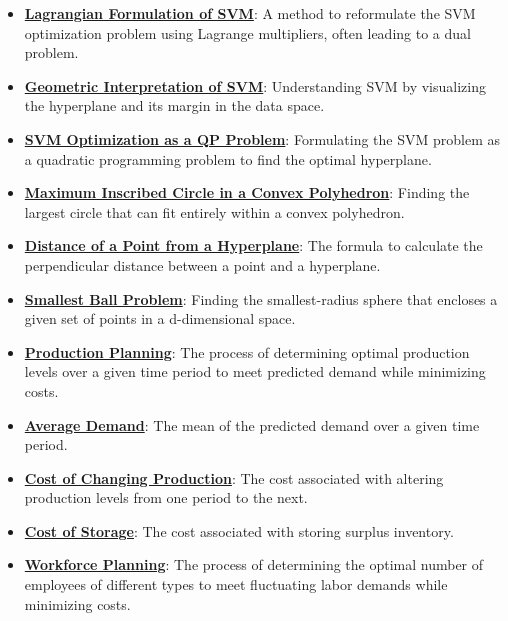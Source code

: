 \documentclass{article}%
\begin{document}
\begin{itemize}[leftmargin=*]
\item \href{https://www.math.purdue.edu/~yipn/421/2024-10-22-Regression.pdf#page=11}{\textbf{Lagrangian Formulation of SVM}}: A method to reformulate the SVM optimization problem using Lagrange multipliers, often leading to a dual problem.%
\item \href{https://www.math.purdue.edu/~yipn/421/2024-10-22-Regression.pdf#page=12}{\textbf{Geometric Interpretation of SVM}}: Understanding SVM by visualizing the hyperplane and its margin in the data space.%
\item \href{https://www.math.purdue.edu/~yipn/421/2024-10-22-Regression.pdf#page=13}{\textbf{SVM Optimization as a QP Problem}}: Formulating the SVM problem as a quadratic programming problem to find the optimal hyperplane.%
\item \href{https://www.math.purdue.edu/~yipn/421/2024-10-22-Regression.pdf#page=15}{\textbf{Maximum Inscribed Circle in a Convex Polyhedron}}: Finding the largest circle that can fit entirely within a convex polyhedron.%
\item \href{https://www.math.purdue.edu/~yipn/421/2024-10-22-Regression.pdf#page=18}{\textbf{Distance of a Point from a Hyperplane}}: The formula to calculate the perpendicular distance between a point and a hyperplane.%
\item \href{https://www.math.purdue.edu/~yipn/421/2024-10-22-Regression.pdf#page=22}{\textbf{Smallest Ball Problem}}: Finding the smallest-radius sphere that encloses a given set of points in a d-dimensional space.%
\item \href{https://www.math.purdue.edu/~yipn/421/2024-10-28-ApplsLinProg.pdf#page=1}{\textbf{Production Planning}}: The process of determining optimal production levels over a given time period to meet predicted demand while minimizing costs.%
\item \href{https://www.math.purdue.edu/~yipn/421/2024-10-28-ApplsLinProg.pdf#page=2}{\textbf{Average Demand}}: The mean of the predicted demand over a given time period.%
\item \href{https://www.math.purdue.edu/~yipn/421/2024-10-28-ApplsLinProg.pdf#page=3}{\textbf{Cost of Changing Production}}: The cost associated with altering production levels from one period to the next.%
\item \href{https://www.math.purdue.edu/~yipn/421/2024-10-28-ApplsLinProg.pdf#page=3}{\textbf{Cost of Storage}}: The cost associated with storing surplus inventory.%
\item \href{https://www.math.purdue.edu/~yipn/421/2024-10-28-ApplsLinProg.pdf#page=7}{\textbf{Workforce Planning}}: The process of determining the optimal number of employees of different types to meet fluctuating labor demands while minimizing costs.%

\end{itemize}
\end{document}
